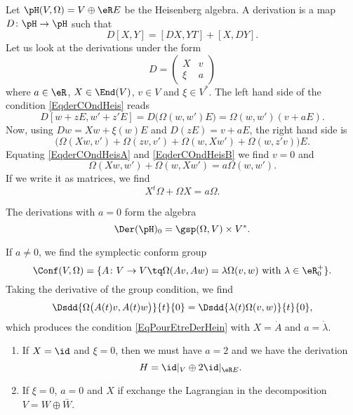 Let $\pH(V,\Omega)=V\oplus\eR E$ be the Heisenberg algebra. A derivation is a map $D\colon \pH \to \pH$ such that
\begin{equation}        \label{EqderCOndHeis}
	D[X,Y]=[DX,YT]+[X,DY].
\end{equation}
Let us look at the derivations under the form
\begin{equation}
	D=\begin{pmatrix}
		X   & v \\
		\xi & a
	\end{pmatrix}
\end{equation}
where $a\in\eR$, $X\in\End(V)$, $v\in V$ and $\xi\in V^*$. The left hand side of the condition \eqref{EqderCOndHeis} reads
\begin{equation}    \label{EqderCOndHeisA}
	D[w+zE,w'+z'E]=D\big( \Omega(w,w')E \big)=\Omega(w,w')(v+aE).
\end{equation}
Now, using $Dw=Xw+\xi(w)E$ and $D(zE)=v+aE$, the right hand side is
\begin{equation}    \label{EqderCOndHeisB}
	\big( \Omega(Xw,v')+\Omega(zv,v')+\Omega(w,Xw')+\Omega(w,z'v) \big)E.
\end{equation}
Equating \eqref{EqderCOndHeisA} and \eqref{EqderCOndHeisB} we find $v=0$ and
\begin{equation}        \label{EqPourEtreDerHein}
	\Omega(Xw,w')+\Omega(w,Xw')=a\Omega(w,w').
\end{equation}
If we write it as matrices, we find
\begin{equation}
	X^t\Omega+\Omega X=a\Omega.
\end{equation}

The derivations with $a=0$ form the algebra
\begin{equation}
	\Der(\pH)_0=\gsp(\Omega,V)\times V^*.
\end{equation}

If $a\neq 0$, we find the symplectic conform group
\begin{equation}
	\Conf(V,\Omega)=\{ A\colon V\to V\tq \Omega(Av,Aw)=\lambda\Omega(v,w)\text{ with }\lambda\in\eR_0^+ \}.
\end{equation}
Taking the derivative of the group condition, we find
\begin{equation}
	\Dsdd{ \Omega\big( A(t)v,A(t)w \big) }{t}{0}=\Dsdd{ \lambda(t)\Omega(v,w) }{t}{0},
\end{equation}
which produces the condition \eqref{EqPourEtreDerHein} with $X=\dot A$ and $a=\dot \lambda$.

\begin{enumerate}

	\item
	      If $X=\id$ and $\xi=0$, then we must have $a=2$ and we have the derivation
	      \begin{equation}
		      H=\id|_V\oplus 2\id|_{\eR E}.
	      \end{equation}
	\item
	      If $\xi=0$, $a=0$ and $X$ if exchange the Lagrangian in the decomposition $V=W\oplus \bar W$.
\end{enumerate}

